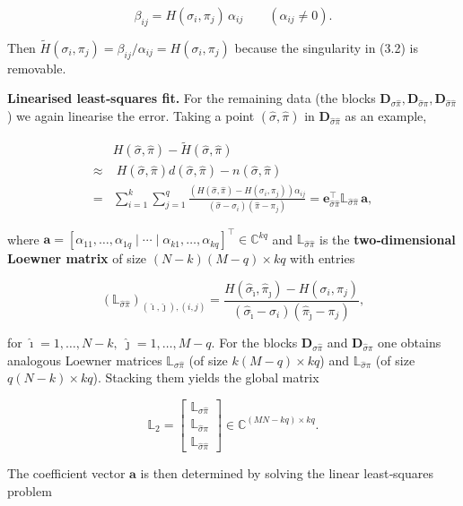 \documentclass{article}
\begin{document}
\[
\beta_{ij}=H(\sigma_i,\pi_j)\,\alpha_{ij}\qquad(\alpha_{ij}\neq0).
\tag{3.4}
\]

Then \(\tilde{H}(\sigma_i,\pi_j)=\beta_{ij}/\alpha_{ij}=H(\sigma_i,\pi_j)\) because the singularity in (3.2) is removable.

\textbf{Linearised least‑squares fit.} For the remaining data (the blocks \(\mathbf{D}_{\sigma\hat\pi},\mathbf{D}_{\hat\sigma\pi},\mathbf{D}_{\hat\sigma\hat\pi}\)) we again linearise the error. Taking a point \((\hat\sigma,\hat\pi)\) in \(\mathbf{D}_{\hat\sigma\hat\pi}\) as an example,

\[
\begin{aligned}
&H(\hat\sigma,\hat\pi)-\tilde{H}(\hat\sigma,\hat\pi)\\[2mm]
\approx&\; H(\hat\sigma,\hat\pi)d(\hat\sigma,\hat\pi)-n(\hat\sigma,\hat\pi)\\
=&\sum_{i=1}^{k}\sum_{j=1}^{q}\frac{(H(\hat\sigma,\hat\pi)-H(\sigma_i,\pi_j))\alpha_{ij}}{(\hat\sigma-\sigma_i)(\hat\pi-\pi_j)}
=\mathbf{e}_{\hat\sigma\hat\pi}^{\top}\mathbb{L}_{\hat\sigma\hat\pi}\,\mathbf{a},
\end{aligned}
\tag{3.6}
\]

where \(\mathbf{a}=[\alpha_{11},\dots,\alpha_{1q}\mid\cdots\mid\alpha_{k1},\dots,\alpha_{kq}]^{\top}\in\mathbb{C}^{kq}\) and \(\mathbb{L}_{\hat\sigma\hat\pi}\) is the \textbf{two‑dimensional Loewner matrix} of size \((N-k)(M-q)\times kq\) with entries

\[
(\mathbb{L}_{\hat\sigma\hat\pi})_{(\hat\imath,\hat\jmath),(i,j)}=\frac{H(\hat\sigma_{\hat\imath},\hat\pi_{\hat\jmath})-H(\sigma_i,\pi_j)}{(\hat\sigma_{\hat\imath}-\sigma_i)(\hat\pi_{\hat\jmath}-\pi_j)},
\tag{3.7}
\]

for \(\hat\imath=1,\dots,N-k,\;\hat\jmath=1,\dots,M-q\).  
For the blocks \(\mathbf{D}_{\sigma\hat\pi}\) and \(\mathbf{D}_{\hat\sigma\pi}\) one obtains analogous Loewner matrices \(\mathbb{L}_{\sigma\hat\pi}\) (of size \(k(M-q)\times kq\)) and \(\mathbb{L}_{\hat\sigma\pi}\) (of size \(q(N-k)\times kq\)). Stacking them yields the global matrix

\[
\mathbb{L}_2=\begin{bmatrix}\mathbb{L}_{\sigma\hat\pi}\\\mathbb{L}_{\hat\sigma\pi}\\\mathbb{L}_{\hat\sigma\hat\pi}\end{bmatrix}\in\mathbb{C}^{(MN-kq)\times kq}.
\tag{3.10}
\]

The coefficient vector \(\mathbf{a}\) is then determined by solving the linear least‑squares problem
\end{document}
